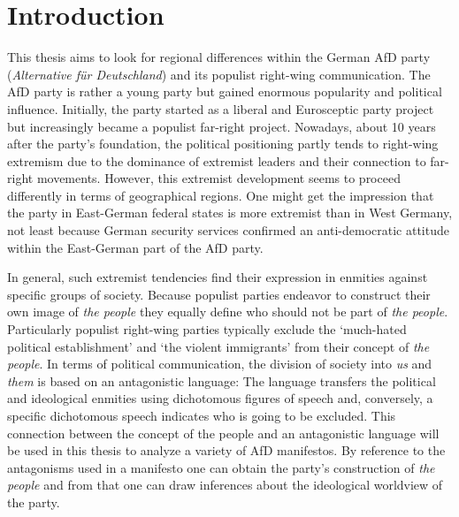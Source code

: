 \documentclass[a4paper]{scrreprt}
\begin{document}
\chapter{Introduction}
This thesis aims to look for regional differences within the German AfD party ({\em Alternative für Deutschland}) and its populist right-wing communication. The AfD party is rather a young party but gained enormous popularity and political influence. Initially, the party started as a liberal and Eurosceptic party project but increasingly became a populist far-right project. Nowadays, about 10 years after the party’s foundation, the political positioning partly tends to right-wing extremism due to the dominance of extremist leaders and their connection to far-right movements. However, this extremist development seems to proceed differently in terms of geographical regions. One might get the impression that the party in East-German federal states is more extremist than in West Germany, not least because German security services confirmed an anti-democratic attitude within the East-German part of the AfD party.\par
In general, such extremist tendencies find their expression in enmities against specific groups of society. Because populist parties endeavor to construct their own image of {\em the people} they equally define who should not be part of {\em the people}. Particularly populist right-wing parties typically exclude the `much-hated political establishment' and `the violent immigrants' from their concept of {\em the people}. In terms of political communication, the division of society into {\em us} and {\em them} is based on an antagonistic language: The language transfers the political and ideological enmities using dichotomous figures of speech and, conversely, a specific dichotomous speech indicates who is going to be excluded. This connection between the concept of the people and an antagonistic language will be used in this thesis to analyze a variety of AfD manifestos. By reference to the antagonisms used in a manifesto one can obtain the party’s construction of {\em the people} and from that one can draw inferences about the ideological worldview of the party.\par
\end{document}
